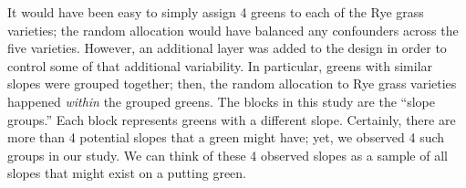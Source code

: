 \documentclass[
  letterpaper,
  DIV=11,
  numbers=noendperiod]{scrreprt}
\theoremstyle{definition}
\theoremstyle{definition}
\theoremstyle{plain}
\theoremstyle{remark}
\begin{document}
\begin{table}

\caption{\label{tbl-anovadata-golf-table}Data from the Overseeding Golf
Greens example.}


\end{table}%

It would have been easy to simply assign 4 greens to each of the Rye
grass varieties; the random allocation would have balanced any
confounders across the five varieties. However, an additional layer was
added to the design in order to control some of that additional
variability. In particular, greens with similar slopes were grouped
together; then, the random allocation to Rye grass varieties happened
\emph{within} the grouped greens. The blocks in this study are the
``slope groups.'' Each block represents greens with a different slope.
Certainly, there are more than 4 potential slopes that a green might
have; yet, we observed 4 such groups in our study. We can think of these
4 observed slopes as a sample of all slopes that might exist on a
putting green.
\end{document}
